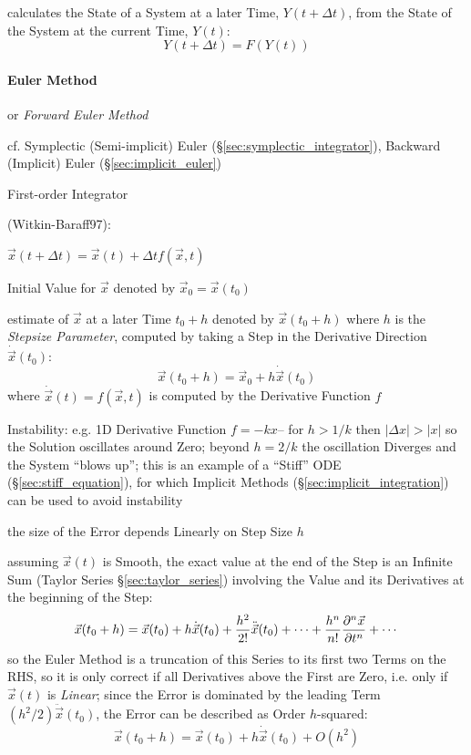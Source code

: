 {calculates the State of a System at a later Time, $Y(t + \Delta{t})$, from the
State of the System at the current Time, $Y(t)$:
\[
  Y(t + \Delta{t}) = F(Y(t))
\]



\paragraph{Euler Method}\label{sec:euler_method}\hfill

or \emph{Forward Euler Method}

\fist cf. Symplectic (Semi-implicit) Euler (\S\ref{sec:symplectic_integrator}),
Backward (Implicit) Euler (\S\ref{sec:implicit_euler})

First-order Integrator

(Witkin-Baraff97):

$\vec{x}(t + \Delta{t}) = \vec{x}(t) + \Delta{t}f(\vec{x},t)$

Initial Value for $\vec{x}$ denoted by $\vec{x}_0 = \vec{x}(t_0)$

estimate of $\vec{x}$ at a later Time $t_0 + h$ denoted by $\vec{x}(t_0 + h)$
where $h$ is the \emph{Stepsize Parameter}, computed by taking a Step in the
Derivative Direction $\dot{\vec{x}}(t_0)$:
\[
  \vec{x}(t_0 + h) = \vec{x}_0 + h\dot{\vec{x}}(t_0)
\]
where $\dot{\vec{x}}(t) = f(\vec{x}, t)$ is computed by the Derivative Function
$f$

Instability: e.g. 1D Derivative Function $f = -kx$-- for $h > 1/k$ then
$|\Delta{x}| > |x|$ so the Solution oscillates around Zero; beyond $h = 2/k$ the
oscillation Diverges and the System ``blows up''; this is an example of a
``Stiff'' ODE (\S\ref{sec:stiff_equation}), for which Implicit Methods
(\S\ref{sec:implicit_integration}) can be used to avoid instability

the size of the Error depends Linearly on Step Size $h$

assuming $\vec{x}(t)$ is Smooth, the exact value at the end of the Step is an
Infinite Sum (Taylor Series \S\ref{sec:taylor_series}) involving the Value and
its Derivatives at the beginning of the Step:
\[
  \vec{x}(t_0 + h) = \vec{x}(t_0) + h\dot{\vec{x}}(t_0) +
    \frac{h^2}{2!}\ddot{\vec{x}}(t_0) + \cdots +
    \frac{h^n}{n!}\frac{\partial{^n\vec{x}}}{\partial{t^n}} + \cdots
\]
so the Euler Method is a truncation of this Series to its first two Terms on the
RHS, so it is only correct if all Derivatives above the First are Zero, i.e.
only if $\vec{x}(t)$ is \emph{Linear}; since the Error is dominated by the
leading Term $(h^2/2)\ddot{\vec{x}}(t_0)$, the Error can be described as Order
$h$-squared:
\[
  \vec{x}(t_0 + h) = \vec{x}(t_0) + h\dot{\vec{x}}(t_0) + O(h^2)
\]

}

